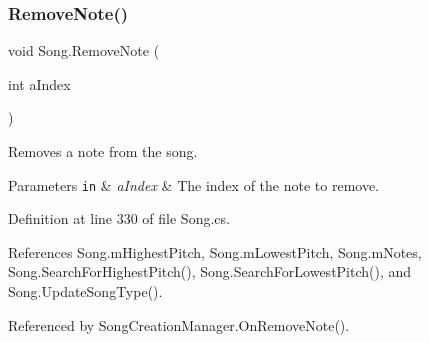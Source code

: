 \subsubsection{\texorpdfstring{Remove\+Note()}{RemoveNote()}}
{\footnotesize\ttfamily void Song.\+Remove\+Note (\begin{DoxyParamCaption}\item[{int}]{a\+Index }\end{DoxyParamCaption})}



Removes a note from the song. 


\begin{DoxyParams}[1]{Parameters}
\mbox{\tt in}  & {\em a\+Index} & The index of the note to remove. \\
\hline
\end{DoxyParams}


Definition at line 330 of file Song.\+cs.



References Song.\+m\+Highest\+Pitch, Song.\+m\+Lowest\+Pitch, Song.\+m\+Notes, Song.\+Search\+For\+Highest\+Pitch(), Song.\+Search\+For\+Lowest\+Pitch(), and Song.\+Update\+Song\+Type().



Referenced by Song\+Creation\+Manager.\+On\+Remove\+Note().


